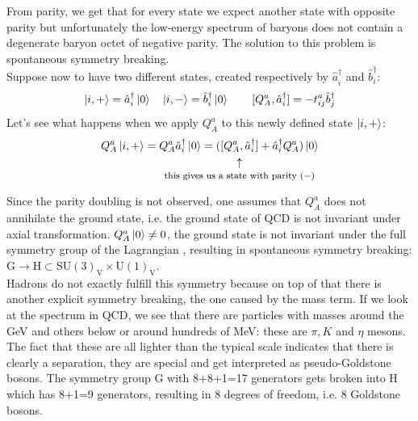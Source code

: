 \documentclass[../main.tex]{subfiles}
\begin{document}
From parity, we get that for every state we expect another state with opposite parity but unfortunately the low-energy spectrum of baryons does not contain a degenerate baryon octet of negative parity. The solution to this problem is spontaneous symmetry breaking.\\
Suppose now to have two different states, created respectively by $\hat{a}_i^\dagger$ and $\hat{b}_i^\dagger$:
\[
\ket{i,+}=\hat{a}_i^\dagger\ket{0} \quad \ket{i,-}=\hat{b}_i^\dagger\ket{0} \qquad [Q_A^a,\hat{a}_i^\dagger]=-t^a_{ij}\hat{b}_j^\dagger
\]
Let's see what happens when we apply $Q_A^a$ to this newly defined state $\ket{i,+}$:
\[
Q_A^a\ket{i,+}=Q_A^a\hat{a}_i^\dagger\ket{0}=(\underset{\mathclap{\tikz \node {$\uparrow$} node [below=1ex] {\footnotesize this gives us a state with parity $(-)$ };}}
{[Q_A^a,\hat{a}_i^\dagger]}+\hat{a}_i^\dagger Q_A^a)\ket{0}
\]
Since the parity doubling is not observed, one assumes that $Q_A^a$ does not annihilate the ground state, i.e. the ground state of QCD is not invariant under axial transformation. $Q_A^a\ket{0}\neq0$, the ground state is not invariant under the full symmetry group of the Lagrangian , resulting in spontaneous symmetry breaking: G$\to$H$\subset$SU$(3)_{\text{V}}\times$U$(1)_{\text{V}}$.\\
Hadrons do not exactly fulfill this symmetry because on top of that there is another explicit symmetry breaking, the one caused by the mass term. If we look at the spectrum in QCD, we see that there are particles with masses around the GeV and others below or around hundreds of MeV: these are $\pi, K$ and $\eta$ mesons. The fact that these are all lighter than the typical scale indicates that there is clearly a separation, they are special and get interpreted as pseudo-Goldstone bosons. The symmetry group G with 8+8+1=17 generators gets broken into H which has 8+1=9 generators, resulting in 8 degrees of freedom, i.e. 8 Goldstone bosons. 
\end{document}
